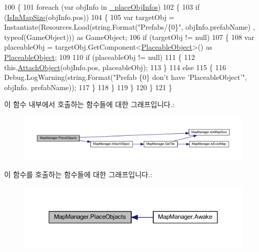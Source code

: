 \begin{DoxyCode}
100     \{
101         \textcolor{keywordflow}{foreach} (var objInfo \textcolor{keywordflow}{in} \hyperlink{class_map_manager_ab581d2c754246f74999a0b744ba2b14f}{\_placeObjInfos})
102         \{
103             \textcolor{keywordflow}{if} (\hyperlink{class_map_manager_a504d7a68ace64557bc3c3254a8b1cddc}{IsInMapSize}(objInfo.pos))
104             \{
105                 var targetObj = Instantiate(Resources.Load(\textcolor{keywordtype}{string}.Format(\textcolor{stringliteral}{"Prefabs/\{0\}"}, objInfo.prefabName)
      , typeof(GameObject))) as GameObject;
106                 if (targetObj != null)
107                 \{
108                     var placeableObj = targetObj.GetComponent<\hyperlink{class_placeable_object}{PlaceableObject}>() as 
      \hyperlink{class_placeable_object}{PlaceableObject};
109 
110                     \textcolor{keywordflow}{if} (placeableObj != null)
111                     \{
112                         this.\hyperlink{class_map_manager_ab8cbf46e369a9c59ff183a1b6c3b20bb}{AttachObject}(objInfo.pos, placeableObj);
113                     \}
114                     \textcolor{keywordflow}{else}
115                     \{
116                         Debug.LogWarning(\textcolor{keywordtype}{string}.Format(\textcolor{stringliteral}{"Prefab \{0\} don't have 'PlaceableObject'"}, objInfo.
      prefabName));
117                     \}
118                 \}
119             \}
120         \}
121     \}
\end{DoxyCode}


이 함수 내부에서 호출하는 함수들에 대한 그래프입니다.\+:\nopagebreak
\begin{figure}[H]
\begin{center}
\leavevmode
\includegraphics[width=350pt]{class_map_manager_a4213ccbaa1a81d0a47884de50a28de32_cgraph}
\end{center}
\end{figure}




이 함수를 호출하는 함수들에 대한 그래프입니다.\+:\nopagebreak
\begin{figure}[H]
\begin{center}
\leavevmode
\includegraphics[width=350pt]{class_map_manager_a4213ccbaa1a81d0a47884de50a28de32_icgraph}
\end{center}
\end{figure}


